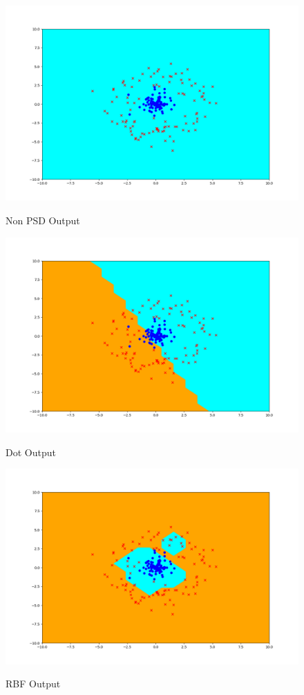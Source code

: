 \begin{answer}
\newpage
\begin{figure}[h!]
  \centering
  \includegraphics[width=.5\linewidth]{perceptron/perceptron_non_psd_output.png}
  \label{fig:sub2}
  \caption{Non PSD Output}
\end{figure}
\begin{figure}[h!]
  \centering
  \includegraphics[width=.5\linewidth]{perceptron/perceptron_dot_output.png}
  \label{fig:sub2}
  \caption{Dot Output}
\end{figure}
\begin{figure}[h!]
  \centering
  \includegraphics[width=.5\linewidth]{perceptron/perceptron_rbf_output.png}
  \label{fig:sub2}
  \caption{RBF Output}
\end{figure}
\end{answer}
